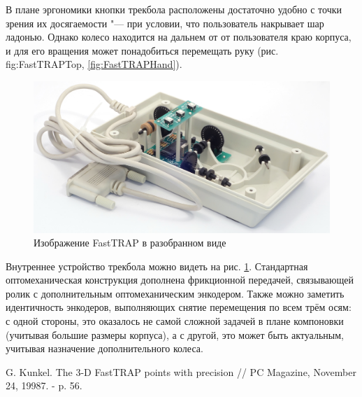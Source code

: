 \documentclass[11pt, a4paper]{article}
\begin{document}
В плане эргономики кнопки трекбола расположены достаточно удобно с точки зрения их досягаемости "--- при условии, что пользователь накрывает шар ладонью. Однако колесо находится на дальнем от от пользователя краю корпуса, и для его вращения может понадобиться перемещать руку (рис. {fig:FastTRAPTop}, \ref{fig:FastTRAPHand}).


\begin{figure}[h]
    \centering
    \includegraphics[scale=0.5]{1987_microspeed_fasttrap/inside_15.jpg}
    \caption{Изображение FastTRAP в разобранном виде}
    \label{fig:FastTRAPInside}
\end{figure}

Внутреннее устройство трекбола можно видеть на рис. \ref{fig:FastTRAPInside}.
Стандартная оптомеханическая конструкция дополнена фрикционной передачей, связывающей ролик с дополнительным оптомеханическим энкодером. Также можно заметить идентичность энкодеров, выполняющих снятие перемещения по всем трём осям: с одной стороны, это оказалось не самой сложной задачей в плане компоновки (учитывая большие размеры корпуса), а с другой, это может быть актуальным, учитывая назначение дополнительного колеса.

\begin{thebibliography}{9}
 G. Kunkel. The 3-D FastTRAP points with precision // PC Magazine, November 24, 19987. - p. 56.
\end{thebibliography}
\end{document}
